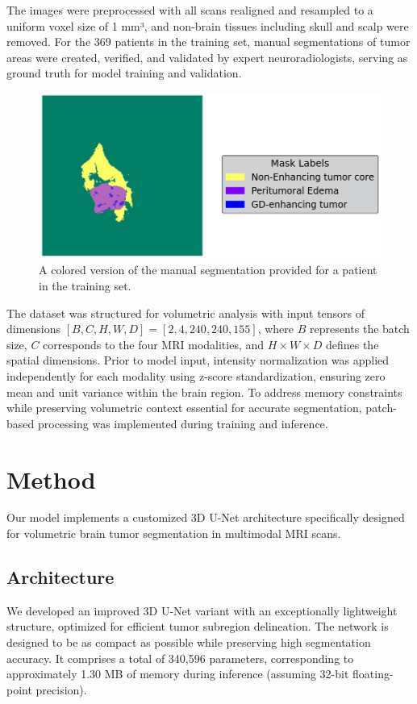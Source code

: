 \documentclass[10pt,twocolumn,letterpaper]{article}
\begin{document}
The images were preprocessed with all scans realigned and resampled to a uniform voxel size of 1 mm³, and non-brain tissues including skull and scalp were removed. For the 369 patients in the training set, manual segmentations of tumor areas were created, verified, and validated by expert neuroradiologists, serving as ground truth for model training and validation.

\begin{figure}[H]
\centering
\includegraphics[width=0.65\linewidth]{img/groundtruth_example.png}
\caption{A colored version of the manual segmentation provided for a patient in the training set.}
\end{figure}

The dataset was structured for volumetric analysis with input tensors of dimensions $[B, C, H, W, D] = [2, 4, 240, 240, 155]$, where $B$ represents the batch size, $C$ corresponds to the four MRI modalities, and $H \times W \times D$ defines the spatial dimensions. Prior to model input, intensity normalization was applied independently for each modality using z-score standardization, ensuring zero mean and unit variance within the brain region. To address memory constraints while preserving volumetric context essential for accurate segmentation, patch-based processing was implemented during training and inference.
\section{Method}
Our model implements a customized 3D U-Net architecture specifically designed for volumetric brain tumor segmentation in multimodal MRI scans.

\subsection{Architecture} \label{Architecture}
We developed an improved 3D U-Net variant with an exceptionally lightweight structure, optimized for efficient tumor subregion delineation. The network is designed to be as compact as possible while preserving high segmentation accuracy. It comprises a total of 340,596 parameters, corresponding to approximately 1.30 MB of memory during inference (assuming 32-bit floating-point precision).
\end{document}
